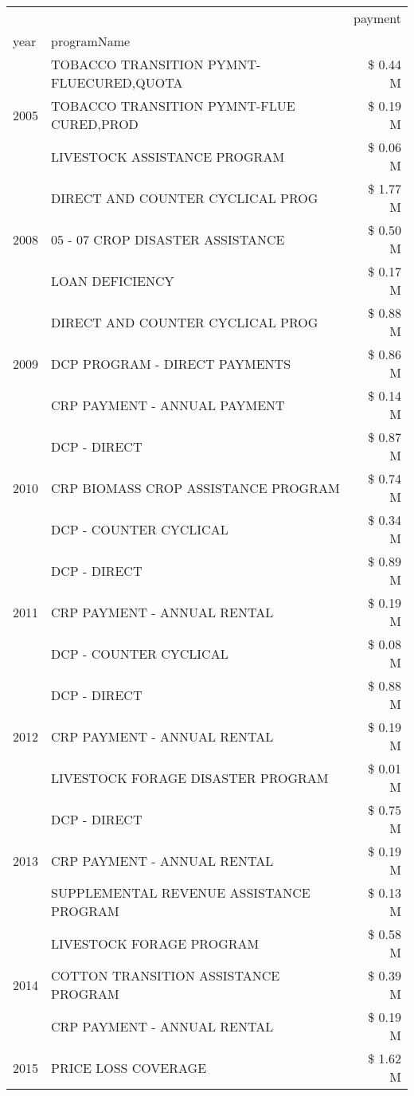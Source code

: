 \begin{tabular}{llr}
\toprule
 &  & payment \\
year & programName &  \\
\midrule
\multirow[t]{3}{*}{2005} & TOBACCO TRANSITION PYMNT-FLUECURED,QUOTA & \$ 0.44 M \\
 & TOBACCO TRANSITION PYMNT-FLUE CURED,PROD & \$ 0.19 M \\
 & LIVESTOCK ASSISTANCE PROGRAM & \$ 0.06 M \\
\cline{1-3}
\multirow[t]{3}{*}{2008} & DIRECT AND COUNTER CYCLICAL PROG & \$ 1.77 M \\
 & 05 - 07 CROP DISASTER ASSISTANCE & \$ 0.50 M \\
 & LOAN DEFICIENCY & \$ 0.17 M \\
\cline{1-3}
\multirow[t]{3}{*}{2009} & DIRECT AND COUNTER CYCLICAL PROG & \$ 0.88 M \\
 & DCP PROGRAM - DIRECT PAYMENTS & \$ 0.86 M \\
 & CRP PAYMENT - ANNUAL PAYMENT & \$ 0.14 M \\
\cline{1-3}
\multirow[t]{3}{*}{2010} & DCP - DIRECT & \$ 0.87 M \\
 & CRP BIOMASS CROP ASSISTANCE PROGRAM & \$ 0.74 M \\
 & DCP - COUNTER CYCLICAL & \$ 0.34 M \\
\cline{1-3}
\multirow[t]{3}{*}{2011} & DCP - DIRECT & \$ 0.89 M \\
 & CRP PAYMENT - ANNUAL RENTAL & \$ 0.19 M \\
 & DCP - COUNTER CYCLICAL & \$ 0.08 M \\
\cline{1-3}
\multirow[t]{3}{*}{2012} & DCP - DIRECT & \$ 0.88 M \\
 & CRP PAYMENT - ANNUAL RENTAL & \$ 0.19 M \\
 & LIVESTOCK FORAGE DISASTER PROGRAM & \$ 0.01 M \\
\cline{1-3}
\multirow[t]{3}{*}{2013} & DCP - DIRECT & \$ 0.75 M \\
 & CRP PAYMENT - ANNUAL RENTAL & \$ 0.19 M \\
 & SUPPLEMENTAL REVENUE ASSISTANCE PROGRAM & \$ 0.13 M \\
\cline{1-3}
\multirow[t]{3}{*}{2014} & LIVESTOCK FORAGE PROGRAM & \$ 0.58 M \\
 & COTTON TRANSITION ASSISTANCE PROGRAM & \$ 0.39 M \\
 & CRP PAYMENT - ANNUAL RENTAL & \$ 0.19 M \\
\cline{1-3}
\multirow[t]{3}{*}{2015} & PRICE LOSS COVERAGE & \$ 1.62 M \\

\end{tabular}
